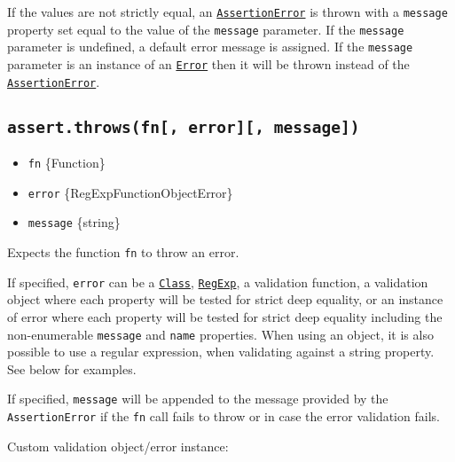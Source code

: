 If the values are not strictly equal, an
\hyperref[class-assertassertionerror]{\texttt{AssertionError}} is thrown
with a \texttt{message} property set equal to the value of the
\texttt{message} parameter. If the \texttt{message} parameter is
undefined, a default error message is assigned. If the \texttt{message}
parameter is an instance of an
\href{errors.md\#class-error}{\texttt{Error}} then it will be thrown
instead of the
\hyperref[class-assertassertionerror]{\texttt{AssertionError}}.

\subsection{\texorpdfstring{\texttt{assert.throws(fn{[},\ error{]}{[},\ message{]})}}{assert.throws(fn{[}, error{]}{[}, message{]})}}\label{assert.throwsfn-error-message}

\begin{itemize}
\tightlist
\item
  \texttt{fn} \{Function\}
\item
  \texttt{error}
  \{RegExp\textbar Function\textbar Object\textbar Error\}
\item
  \texttt{message} \{string\}
\end{itemize}

Expects the function \texttt{fn} to throw an error.

If specified, \texttt{error} can be a
\href{https://developer.mozilla.org/en-US/docs/Web/JavaScript/Reference/Classes}{\texttt{Class}},
\href{https://developer.mozilla.org/en-US/docs/Web/JavaScript/Guide/Regular_Expressions}{\texttt{RegExp}},
a validation function, a validation object where each property will be
tested for strict deep equality, or an instance of error where each
property will be tested for strict deep equality including the
non-enumerable \texttt{message} and \texttt{name} properties. When using
an object, it is also possible to use a regular expression, when
validating against a string property. See below for examples.

If specified, \texttt{message} will be appended to the message provided
by the \texttt{AssertionError} if the \texttt{fn} call fails to throw or
in case the error validation fails.

Custom validation object/error instance:

